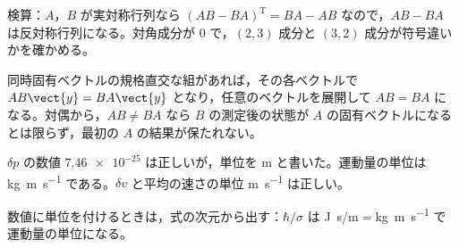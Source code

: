 \begin{rikai}
  \item 検算：$A$，$B$ が実対称行列なら $(AB-BA)^{\mathrm{T}}=BA-AB$ なので，$AB-BA$ は反対称行列になる。対角成分が $0$ で，$(2,3)$ 成分と $(3,2)$ 成分が符号違いかを確かめる。
  \item 同時固有ベクトルの規格直交な組があれば，その各ベクトルで $AB\vect{y}=BA\vect{y}$ となり，任意のベクトルを展開して $AB=BA$ になる。対偶から，$AB\ne BA$ なら $B$ の測定後の状態が $A$ の固有ベクトルになるとは限らず，最初の $A$ の結果が保たれない。
\end{rikai}
\begin{kotaeran}
   $\delta p$ の数値 $\num{7.46e-25}$ は正しいが，単位を \unit{\metre} と書いた。運動量の単位は \unit{\kilogram\metre\per\second} である。$\delta v$ と平均の速さの単位 \unit{\metre\per\second} は正しい。
\end{kotaeran}
\begin{rikai}
  \item 数値に単位を付けるときは，式の次元から出す：$\hbar/\sigma$ は \unit{\joule\second}/\unit{\metre}$=$\unit{\kilogram\metre\per\second} で運動量の単位になる。
\end{rikai}

